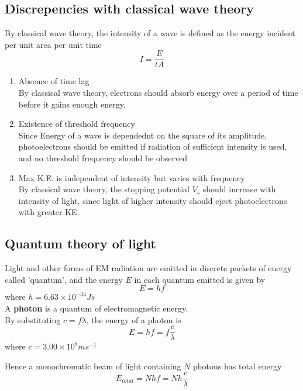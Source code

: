 \documentclass[a4paper, 10pt]{article}
\begin{document}
\subsection{Discrepencies with classical wave theory}
      By classical wave theory, the intensity of a wave is defined as the energy incident per unit area per unit time
      \[
      I = \frac{E}{tA}
      \]
\begin{enumerate}
   \item Absence of time lag \\

      By classical wave theory, electrons should absorb energy over a period of time before it gains enough energy. 

   \item Existence of threshold frequency \\

      Since Energy of a wave is dependednt on the square of its amplitude, photoelectrons should be emitted if radiation of sufficient intensity is used, and no threshold frequency should be observed
   \item Max K.E. is independent of intensity but varies with frequency\\

      By classical wave theory, the stopping potential $V_s$ should increase with intensity of light, since light of higher intensity should eject photoelectrons with greater KE.
\end{enumerate}	

\subsection{Quantum theory of light}

\begin{framed}
   Light and other forms of EM radiation are emitted in discrete packets of energy called 'quantum', and the energy $E$ in each quantum emitted is given by
   \[
   E = hf
   \]
   where $h = 6.63 \times 10^{-34}Js $ \\
  
   A \textbf{photon} is a quantum of electromagnetic energy.  \\

   By substituting $c = f\lambda$, the energy of a photon is
   \[
    E = hf = f \frac{c}{\lambda}
   \]
   where $c = 3.00 \times 10^8 ms^{-1}$ 
\end{framed}	

Hence a monochromatic beam of light containing $N$ photons has total energy
\[
   E_{total} = Nhf = Nh \frac{c}{\lambda}
\]
\end{document}
